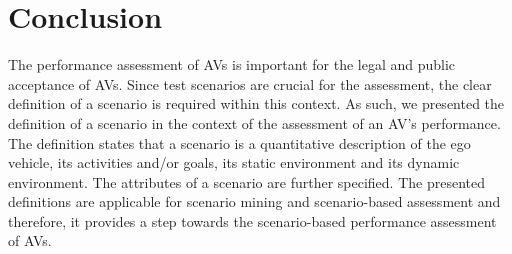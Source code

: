 \section{Conclusion}
\label{sec:conclusion}

The performance assessment of AVs is important for the legal and public acceptance of AVs. Since test scenarios are crucial for the assessment, the clear definition of a scenario is required within this context. As such, we presented the definition of a scenario in the context of the assessment of an AV's performance. The definition states that a scenario is a quantitative description of the ego vehicle, its activities and/or goals, its static environment and its dynamic environment. The attributes of a scenario are further specified. The presented definitions are applicable for scenario mining and scenario-based assessment and therefore, it provides a step towards the scenario-based performance assessment of AVs. 
